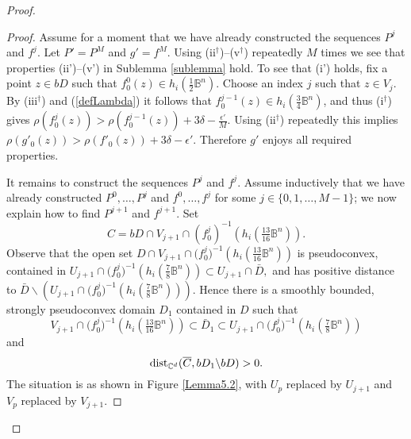 \documentclass[11pt]{amsart}
\numberwithin{equation}{section}
\theoremstyle{definition}
\begin{document}
\begin{proof}
\begin{proof}
Assume for a moment that we have already constructed the sequences $P^j$ and $f^j$.
Let $P'=P^M$ and $g'=f^M$. Using (ii$^\dagger$)--(v$^\dagger$) repeatedly $M$ times
we see that properties (ii')--(v') in Sublemma \ref{sublemma} hold. 
To see that  (i') holds, fix 
a point $z\in bD$ such that $f^0_0(z)\in h_i(\tfrac12 {\mathbb{B}}^n)$. 
Choose an index $j$ such that $z\in V_j$. 
By (iii$^\dagger$) and (\ref{defLambda})
it follows that $f^{j-1}_0(z)\in h_i(\tfrac34 {\mathbb{B}}^n)$,
and thus (i$^\dagger$) gives $\rho(f^{j}_0(z))>\rho(f^{j-1}_0(z))+ 3{\delta}-\tfrac{{\epsilon}'}M$.
Using (ii$^\dagger$) repeatedly this implies  
$\rho(g'_0(z))>\rho(f'_0(z))+3{\delta}-{{\epsilon}'}$. 
Therefore $g'$ enjoys all required properties. 

It remains to construct the sequences $P^j$ and $f^j$.
Assume inductively that we have already constructed 
$P^0,\ldots,P^j$ and $f^0,\ldots,f^j$ 
for some $j\in\{0,1,\ldots,M-1\}$; we now explain how
to find $P^{j+1}$ and $f^{j+1}$. Set 
\[
	C=  bD\cap V_{j+1}\cap(f_0^j)^{-1}(h_i(\tfrac{13}{16}{\mathbb{B}}^n)).
\]
Observe that the open set
$
	D\cap V_{j+1}\cap \bigl(f_0^j\bigr)^{-1}\left(h_i\left(\tfrac{13}{16}{\mathbb{B}}^n\right)\right)
$
is pseudoconvex, contained in 
$
	U_{j+1}\cap \bigl(f_0^j\bigr)^{-1}\left(h_i\left(\tfrac{7}{8}{\mathbb{B}}^n\right)\right)
	\subset U_{j+1}\cap \bar D,
$
and has positive distance to 
$
	\bar D{\backslash} \left( U_{j+1}\cap  \bigl(  f_0^j\bigr)^{-1}\left(h_i\left(\tfrac{7}{8}{\mathbb{B}}^n\right)\right) \right). 
$ 
Hence there is a smoothly bounded, strongly pseudoconvex
domain $D_1$ contained in $D$ such that 
\[
	V_{j+1}\cap \bigl(f_0^j\bigr)^{-1} \left(h_i\left(\tfrac{13}{16}{\mathbb{B}}^n\right)\right)
  \subset \bar D_1\subset 
  U_{j+1}\cap \bigl(f_0^j\bigr)^{-1}\left(h_i\left(\tfrac{7}{8}{\mathbb{B}}^n\right)\right)
\]
and 
\[
	{\rm dist}_{{\mathbb{C}}^d}(\overline C, bD_1 {\backslash} bD) >0.
\]
The situation is as shown in Figure \ref{Lemma5.2}, with $U_p$ replaced by $U_{j+1}$
and $V_p$ replaced by $V_{j+1}$. 


\end{proof}
\end{proof}
\end{document}
